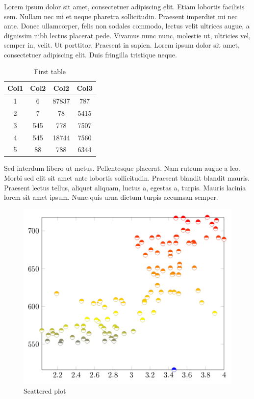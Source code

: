 \documentclass{article}
\begin{document}
Lorem ipsum dolor sit amet, consectetuer adipiscing elit. Etiam lobortis
facilisis sem. Nullam nec mi et neque pharetra sollicitudin. Praesent imperdiet
mi nec ante. Donec ullamcorper, felis non sodales commodo, lectus velit ultrices
augue, a dignissim nibh lectus placerat pede. Vivamus nunc nunc, molestie
ut, ultricies vel, semper in, velit. Ut porttitor. Praesent in sapien. Lorem
ipsum dolor sit amet, consectetuer adipiscing elit. Duis fringilla tristique neque.

\begin{table}[h]
\centering
 \begin{tabular}{||c c c c||} 
 \hline
 Col1 & Col2 & Col2 & Col3 \\ [0.5ex] 
 \hline\hline
 1 & 6 & 87837 & 787 \\ 
 \hline
 2 & 7 & 78 & 5415 \\
 \hline
 3 & 545 & 778 & 7507 \\
 \hline
 4 & 545 & 18744 & 7560 \\
 \hline
 5 & 88 & 788 & 6344 \\ [1ex] 
 \hline
 \end{tabular}
\caption{First table}
\label{tab:table1}
\end{table}

Sed interdum libero ut metus. Pellentesque placerat. Nam rutrum augue a
leo. Morbi sed elit sit amet ante lobortis sollicitudin. Praesent blandit blandit
mauris. Praesent lectus tellus, aliquet aliquam, luctus a, egestas a, turpis.
Mauris lacinia lorem sit amet ipsum. Nunc quis urna dictum turpis accumsan
semper.

\begin{figure}
\centering
\includegraphics[scale=0.5]{Scattered}
\caption{Scattered plot}
\label{fig:figure3}
\end{figure}
\end{document}
